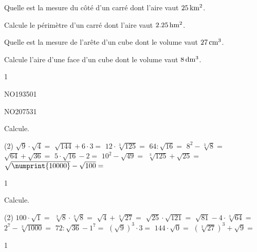 \documentclass[a4paper,11pt]{report}
\begin{document}
\begin{exo}{
\begin{tasks}
    
\task Quelle est la mesure du côté d'un carré dont l'aire vaut $\tunit{25}{\kilo m^2}$.

\task Calcule le périmètre d'un carré dont l'aire vaut $\tunit{2,25}{\hecto m^2}$.

\task Quelle est la mesure de l'arête d'un cube dont le volume vaut $\tunit{27}{\centi m^3}$.

\task Calcule l'aire d'une face d'un cube dont le volume vaut $\tunit{8}{\deci m^3}$.
\end{tasks}
}{1}
\end{exo}

\begin{exol}{NO193}{50}{1} %
\end{exol}

\begin{exol}{NO207}{53}{1} %
\end{exol}
















\begin{exop}{%
Calcule.
\begin{tasks}(2)
    \task $\sqrt{9}\cdot\sqrt{4}=$
    \task $\sqrt{144}+6\cdot3=$
    \task $12\cdot\sqrt[3]{125}=$
    \task $64:\sqrt{16}=$
    \task $8^2-\sqrt[3]{8}=$
    \task $\sqrt{64}+\sqrt{36}=$
    \task $5\cdot\sqrt{16}-2=$
    \task $10^2-\sqrt{49}=$
    \task $\sqrt[3]{125}+\sqrt{25}=$
    \task $\sqrt{\numprint{10000}}-\sqrt{100}=$
\end{tasks}
}{1}    
\end{exop}


\begin{exop}{%
Calcule.
\begin{tasks}(2)
    \task $100\cdot\sqrt{1}=$
    \task $\sqrt[3]{8}\cdot\sqrt[3]{8}=$
    \task $\sqrt{4}+\sqrt[3]{27}=$
    \task $\sqrt{25}\cdot\sqrt{121}=$
    \task $\sqrt{81}-4\cdot\sqrt[3]{64}=$
    \task $2^7-\sqrt[3]{1000}=$
    \task $72:\sqrt{36}-1^7=$
    \task $(\sqrt{9})^3\cdot3=$
    \task $144\cdot\sqrt{0}=$
    \task $(\sqrt[3]{27})^3+\sqrt{9}=$
\end{tasks}
}{1}    
\end{exop}
\end{document}
